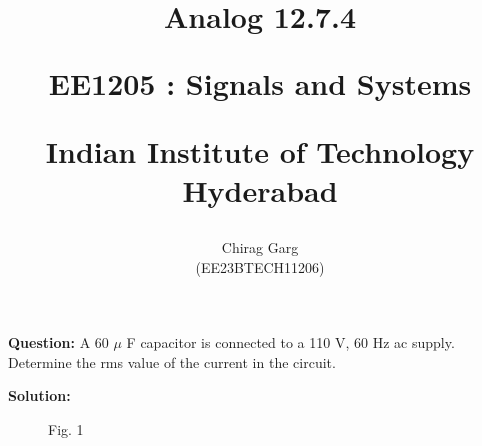 \documentclass[journal,12pt,twocolumn]{IEEEtran}
\theoremstyle{remark}
\begin{document}
%






\title{
Analog 12.7.4

\large{EE1205 : Signals and Systems}

Indian Institute of Technology Hyderabad
}
\author{Chirag Garg

(EE23BTECH11206)
}	





\maketitle

\newpage



\bigskip

\renewcommand{\thefigure}{\theenumi}
\renewcommand{\thetable}{\theenumi}




\textbf{Question:} A 60 $\mu$ F capacitor is connected to a 110 V, 60 Hz ac supply. Determine
the rms value of the current in the circuit.


\textbf{Solution: }
\begin{figure}[!h]
 \centering
    
    \caption*{Fig. 1}
    \label{fig:enter-label}
\end{figure}
\end{document}
